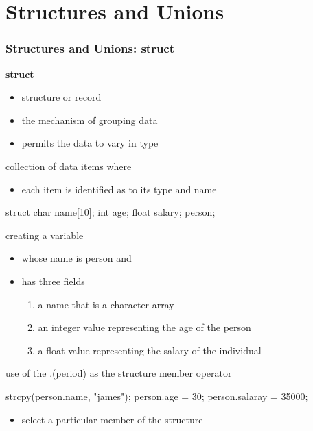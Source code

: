 \documentclass[newPxFont,sthlmFooter,nooffset]{beamer}
\begin{document}
\section{Structures and Unions}

\begin{frame}
  \frametitle{Structures and Unions: struct}
\textbf{struct}  
\begin{itemize}
\item structure or record
\item the mechanism of grouping data
\item permits the data to vary in type
\end{itemize}
\bigskip

collection of data items where
\begin{itemize}
\item each item is identified as to its type and name
\end{itemize}


\framebreak


\begin{codedef}
struct {
    char name[10];
    int age;
    float salary;
} person;
\end{codedef}
\bigskip
creating a variable
\begin{itemize}
\item whose name is person and
\item has three fields
  \begin{enumerate}
  \item a name that is a character array
  \item an integer value representing the age of the person
  \item a float value representing the salary of the individual
  \end{enumerate}

\end{itemize}


\framebreak


use of the .(period) as the structure member operator

\begin{codedef}
strcpy(person.name, "james");
person.age = 30;
person.salaray = 35000;  
\end{codedef}
\bigskip
\begin{itemize}
\item select a particular member of the structure
\end{itemize}


\end{frame}
\end{document}
